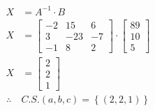 \documentclass[10pt, a4paper]{article}
\begin{document}
\begin{align*}
  X &= A^{-1} \cdot B\\
  X &= \begin{bmatrix}
    -2 & 15 & 6\\
    3 & -23 & -7\\
    -1 & 8 & 2
  \end{bmatrix} \cdot \begin{bmatrix}
    89\\
    10\\
    5
  \end{bmatrix}\\
  X &= \begin{bmatrix}
    2\\
    2\\
    1
  \end{bmatrix}
\end{align*}
\begin{align*}
  \therefore \ &C.S. \left(a,b,c\right) = \left\{\left(2,2,1\right)\right\}
\end{align*}
\newpage
\end{document}
